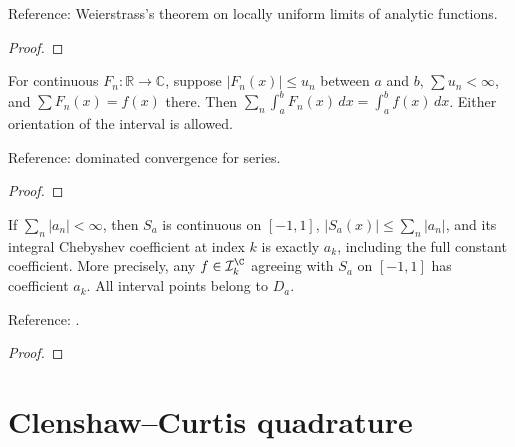 \begin{supporting}
\begin{theorem}
Reference: Weierstrass's theorem on locally uniform limits of analytic functions.
\end{theorem}
\begin{proof}
\leanok
\end{proof}

\begin{theorem}
\label{thm:series-termwise-integration}
\leanok
For continuous $F_n:\mathbb R\to\mathbb C$, suppose $|F_n(x)|\le u_n$ between
$a$ and $b$, $\sum u_n<\infty$, and $\sum F_n(x)=f(x)$ there. Then
$\sum_n\int_a^b F_n(x)\,dx=\int_a^b f(x)\,dx$.
Either orientation of the interval is allowed.

Reference: dominated convergence for series.
\end{theorem}
\begin{proof}
\leanok
\end{proof}

\begin{theorem}
\label{thm:absolute-series-coefficients}
\leanok
If $\sum_n|a_n|<\infty$, then $S_a$ is continuous on $[-1,1]$,
$|S_a(x)|\le\sum_n|a_n|$, and its integral Chebyshev coefficient at index $k$
is exactly $a_k$, including the full constant coefficient. More precisely,
any $f\in\mathcal I_k^{\C}$ agreeing with $S_a$ on $[-1,1]$ has coefficient $a_k$.
All interval points belong to $D_a$.

Reference: \cite[Chapters 3 and 4]{atap}.
\end{theorem}
\begin{proof}
\leanok
\end{proof}

\end{supporting}

\chapter{Clenshaw--Curtis quadrature}\label{chap:cc}

